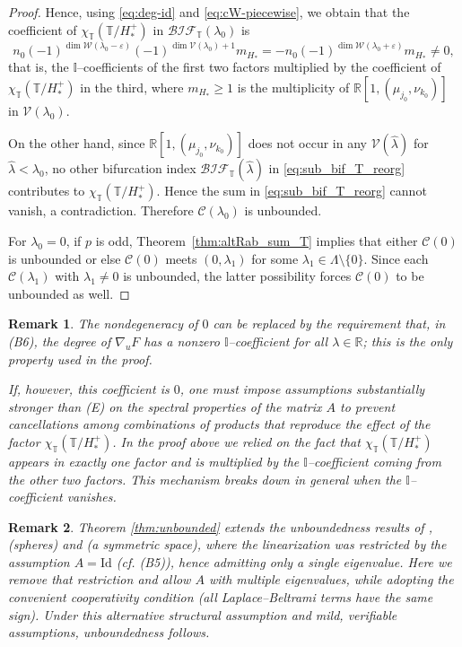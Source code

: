 \documentclass[reqno,twoside,12pt]{amsart}
\newtheorem{Remark}{Remark}[section]
\newcommand{\bI}{\mathbb{I}}
\newcommand{\bR}{\mathbb{R}}
\newcommand{\bT}{\mathbb{T}}
\newcommand{\cV}{\mathcal{V}}
\newcommand{\cW}{\mathcal{W}}
\numberwithin{equation}{section} \errorcontextlines=0
\newcommand{\bif}{\mathcal{BIF}}
\begin{document}
\begin{proof}
Hence, using \eqref{eq:deg-id} and \eqref{eq:cW-piecewise}, we obtain that the coefficient of $\chi_{\bT}(\bT/H_{*}^{+})$ in $\bif_{\bT}(\lambda_{0})$ is
\[
n_{0}(-1)^{\dim\cW(\lambda_{0}-\varepsilon)}(-1)^{\dim\cV(\lambda_{0})+1}m_{H_*}
= -n_{0}(-1)^{\dim\cW(\lambda_{0}+\varepsilon)}m_{H_*}\neq 0,
\]
that is, the $\bI$–coefficients of the first two factors multiplied by the coefficient of $\chi_{\bT}(\bT/H_{*}^{+})$ in the third, where $m_{H_*}\ge 1$ is the multiplicity of $\bR[1,(\mu_{j_0},\nu_{k_0})]$ in $\cV(\lambda_0)$.

On the other hand, since $\bR[1,(\mu_{j_0},\nu_{k_0})]$ does not occur in any $\cV(\widehat{\lambda})$ for $\widehat{\lambda}<\lambda_0$, no other bifurcation index $\bif_{\bT}(\widehat{\lambda})$ in \eqref{eq:sub_bif_T_reorg} contributes to $\chi_{\bT}(\bT/H_{*}^{+})$. Hence the sum in \eqref{eq:sub_bif_T_reorg} cannot vanish, a contradiction. Therefore $\mathcal{C}(\lambda_0)$ is unbounded.

For $\lambda_0=0$, if $p$ is odd, Theorem~\ref{thm:altRab_sum_T} implies that either $\mathcal{C}(0)$ is unbounded or else $\mathcal{C}(0)$ meets $(0,\lambda_1)$ for some $\lambda_1\in\Lambda\setminus\{0\}$. Since each $\mathcal{C}(\lambda_1)$ with $\lambda_1\ne 0$ is unbounded, the latter possibility forces $\mathcal{C}(0)$ to be unbounded as well.
\end{proof}

\begin{Remark}
The nondegeneracy of $0$ can be replaced by the requirement that, in \textnormal{(B6)}, the degree of $\nabla_{u}F$ has a nonzero $\bI$–coefficient for all $\lambda\in\bR$; this is the only property used in the proof.

If, however, this coefficient is $0$, one must impose assumptions substantially stronger than \textnormal{(E)} on the spectral properties of the matrix $A$ to prevent cancellations among combinations of products that reproduce the effect of the factor $\chi_{\bT}(\bT/H_{*}^{+})$. In the proof above we relied on the fact that $\chi_{\bT}(\bT/H_{*}^{+})$ appears in exactly one factor and is multiplied by the $\bI$–coefficient coming from the other two factors. This mechanism breaks down in general when the $\bI$–coefficient vanishes.
\end{Remark}

\begin{Remark}
Theorem \ref{thm:unbounded} extends the unboundedness results of \cite{RybickiLB}, \cite{RybSte2015} (spheres) and \cite{Stefaniak2025} (a symmetric space), where the linearization was restricted by the assumption $A=\mathrm{Id}$ (cf. \textnormal{(B5)}), hence admitting only a single eigenvalue. Here we remove that restriction and allow $A$ with multiple eigenvalues, while adopting the convenient cooperativity condition (all Laplace--Beltrami terms have the same sign). Under this alternative structural assumption and mild, verifiable assumptions, unboundedness follows.
\end{Remark}
\end{document}
